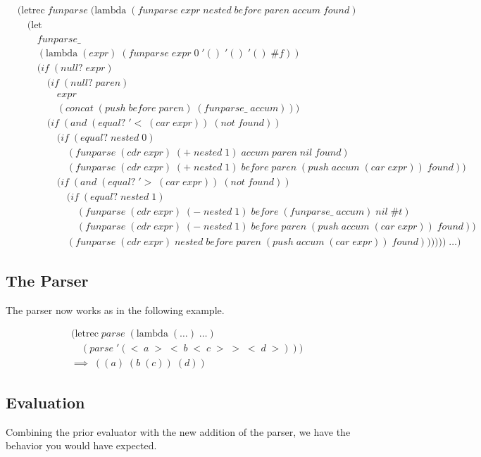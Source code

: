 \begin{align*}
& (\text{letrec} \; funparse \; (\text{lambda} \; (funparse \; expr \; nested \; before \; paren \; accum \; found) \; 
\\& \quad (\text{let} \; 
\\& \qquad funparse\_ \; 
\\& \qquad (\text{lambda} \; (expr) \; (funparse \; expr \; 0 \; '() \; '() \; '() \; \#f))
\\& \qquad (if \; (null? \; expr)
\\& \qquad \quad (if \; (null? \; paren) \; 
\\& \qquad \qquad expr
\\& \qquad \qquad (concat \; (push \; before \; paren) \; (funparse\_ \; accum)))
\\& \qquad \quad (if \; (and \; (equal? \; '< \; (car \; expr)) \; (not \; found))
\\& \qquad \qquad (if \; (equal? \; nested \; 0)
\\& \qquad \qquad \quad (funparse \; (cdr \; expr) \; (+ \; nested \; 1) \; accum \; paren \; nil \; found)
\\& \qquad \qquad \quad (funparse \; (cdr \; expr) \; (+ \; nested \; 1) \; before \; paren \; (push \; accum \; (car \; expr)) \; found))
\\& \qquad \qquad (if \; (and \; (equal? \; '> \; (car \; expr)) \; (not \; found))
\\& \qquad \qquad \quad (if \; (equal? \; nested \; 1)
\\& \qquad \qquad \qquad (funparse \; (cdr \; expr) \; (- \; nested \; 1) \; before \; (funparse\_ \; accum) \; nil \; \#t)
\\& \qquad \qquad \qquad (funparse \; (cdr \; expr) \; (- \; nested \; 1) \; before \; paren \; (push \; accum \; (car \; expr)) \; found))
\\& \qquad \qquad \quad (funparse \; (cdr \; expr) \; nested \; before \; paren \; (push \; accum \; (car \; expr)) \; found)))))) \; \dots)
\end{align*}

\subsection{The Parser}
The parser now works as in the following example.

\begin{align*}
& (\text{letrec} \; parse \; (\text{lambda} \; (\dots) \; \dots)
\\& \quad (parse \; '(< \; a \; > \; < \; b \; < \; c \; > \; > \; < \; d \; >)))
\\& \implies \; ((a) \; (b \; (c)) \; (d))
\end{align*}

\subsection{Evaluation}
Combining the prior evaluator with the new addition of the parser, we have the behavior you would have expected.
